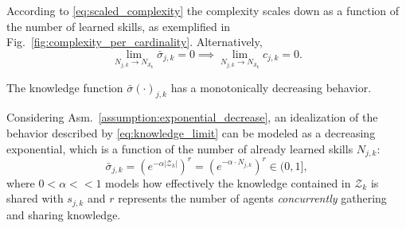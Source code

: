 According to \eqref{eq:scaled_complexity} the complexity scales down as a function of the number of learned skills, as exemplified in Fig.~\ref{fig:complexity_per_cardinality}. Alternatively,
\begin{equation}\label{eq:knowledge_limit}
    \lim_{N_{j,k}\to N_{\mathcal{S}_k}} \bar{\sigma}_ {j,k} = 0 \implies \lim_{N_{j,k}\to N_{\mathcal{S}_k}} c_{j,k} = 0.
\end{equation}

\begin{tcolorbox}
	\begin{assumption}\label{assumption:exponential_decrease} The knowledge function $\bar{\sigma}(\cdot)_{j,k}$ has a monotonically decreasing behavior.
	\end{assumption}
\end{tcolorbox} 
Considering Asm.~\ref{assumption:exponential_decrease}, an idealization of the behavior described by \eqref{eq:knowledge_limit} can be modeled as a decreasing exponential, which is a function of the number of already learned skills $N_{j,k}$:%
\begin{equation}\label{eq:incremental_knowledge}
     \boxed{\bar{\sigma}_{j,k} = \left(e^{-\alpha |\mathcal{Z}_k|}\right)^r = \left(e^{-\alpha  \cdot N_{j,k}}\right)^r \in (0,1],}
\end{equation}
where $ 0<\alpha<<1$ models how effectively the knowledge contained in $\mathcal{Z}_k$ is shared with $s_{j,k}$ and $r$ represents the number of agents \emph{concurrently} gathering and sharing knowledge.

